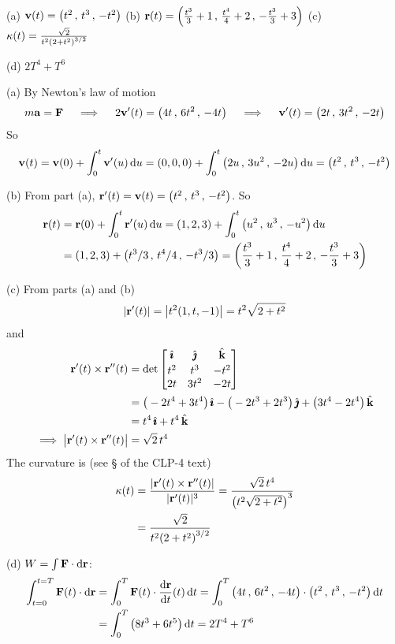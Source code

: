 \begin{answer} 
(a) $\mathbf{v}(t) = \big(t^2\,,\,t^3\,,\,-t^2\big) $\quad
(b) $\mathbf{r}(t) 
    =\left(\frac{t^3}{3}+1\,,\,\frac{t^4}{4}+2\,,\,-\frac{t^3}{3}+3\right)$\quad
(c) $\kappa(t) =\frac{\sqrt{2}}{t^2{(2+t^2)}^{3/2}}$

(d) $2T^4 + T^6$
\end{answer}

\begin{solution} 
(a) By Newton's law of motion
\begin{equation*}
m\mathbf{a} =\mathbf{F}\quad
\implies\quad
2\mathbf{v}'(t) = \big(4t\,,\,6t^2\,,\,-4t\big) \quad
\implies\quad
\mathbf{v}'(t) = \big(2t\,,\,3t^2\,,\,-2t\big) 
\end{equation*}
So
\begin{equation*}
\mathbf{v}(t) = \mathbf{v}(0) +\int_0^t \mathbf{v}'(u)\, \mathrm{d}u
       = (0,0,0) + \int_0^t \big(2u\,,\,3u^2\,,\,-2u\big) \, \mathrm{d}u
       = \big(t^2\,,\,t^3\,,\,-t^2\big) 
\end{equation*}

(b) From part (a), $\mathbf{r}'(t) = \mathbf{v}(t) = \big(t^2\,,\,t^3\,,\,-t^2\big)$.
So
\begin{align*}
\mathbf{r}(t) &= \mathbf{r}(0) +\int_0^t \mathbf{r}'(u)\, \mathrm{d}u
       = (1,2,3) + \int_0^t \big(u^2\,,\,u^3\,,\,-u^2\big) \, \mathrm{d}u \\
       &= (1,2,3) + \big(t^3/3\,,\,t^4/4\,,\,-t^3/3\big)  
       =\left(\frac{t^3}{3}+1\,,\,\frac{t^4}{4}+2\,,\,-\frac{t^3}{3}+3\right)
\end{align*}

(c) From parts (a) and (b)
\begin{equation*}
|\mathbf{r}'(t)|= \big|t^2(1,t,-1)\big| = t^2 \sqrt{2+t^2}
\end{equation*}
and
\begin{align*}
\mathbf{r}'(t)\times\mathbf{r}''(t)&= \det\left[\begin{matrix}\hat{\pmb{\imath}}&\hat{\pmb{\jmath}}&\hat{\mathbf{k}}\\[0.03in] 
     t^2 & t^3 & -t^2\\
     2t  & 3t^2 & -2t\end{matrix}\right] \\
&=\big(-2t^4+3t^4\big)\,\hat{\pmb{\imath}} -\big(-2t^3+2t^3\big)\,\hat{\pmb{\jmath}} 
          + \big(3t^4-2t^4\big)\,\hat{\mathbf{k}} \\
& = t^4\,\hat{\pmb{\imath}} +t^4\,\hat{\mathbf{k}} \\
\implies \big|\mathbf{r}'(t)\times\mathbf{r}''(t)\big| &= \sqrt{2}\, t^4
\end{align*}
The curvature is (see \S{} of the CLP-4 text)
\begin{align*}
\kappa(t)  &= \frac{|\mathbf{r}'(t)\times\mathbf{r}''(t)|}{|\mathbf{r}'(t)|^3}
=\frac{\sqrt{2}\, t^4}{{\big(t^2 \sqrt{2+t^2}\big)}^3} \\
&=\frac{\sqrt{2}}{t^2{(2+t^2)}^{3/2}}
\end{align*}

(d)  $W=\int \mathbf{F} \cdot\mathrm{d}\mathbf{r}$:
\begin{align*}
\int_{t=0}^{t=T} \vF(t)\cdot \dee{\vr}
&=\int_0^T \vF(t)\cdot \diff{\vr}{t}(t)\,\dee{t}
=\int_0^T \big(4t\,,\,6t^2\,,\,-4t\big)\cdot 
\big(t^2\,,\,t^3\,,\,-t^2\big)\,\dee{t} \\ 
&= \int_0^T \big(8t^3+6t^5\big)\,\dee{t} 
=2T^4 + T^6
\end{align*}
\end{solution}
